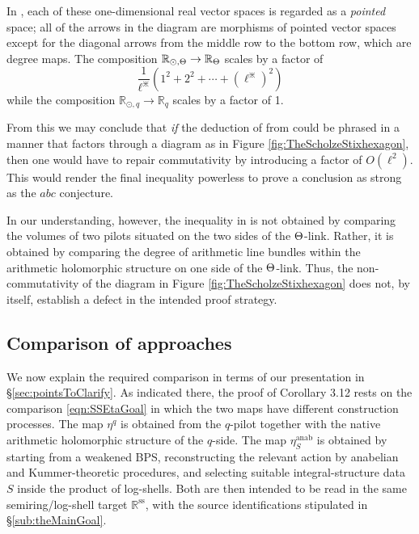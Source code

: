 \documentclass[12pt, reqno, a4paper]{amsart}
\def\bR{\mathbb{R}} %
\begin{document}
In \cite{Scholze2018WhyA}, each of these one-dimensional real vector spaces is regarded as a \textit{pointed} space; all of the arrows in the diagram are morphisms of pointed vector spaces except for the diagonal arrows from the middle row to the bottom row, which are degree maps.
The composition $\bR_{\odot,\Th} \to \bR_{\Th}$ scales by a factor of
\[
\frac{1}{\ell^{\divideontimes}} (1^2 + 2^2 + \cdots + (\ell^{\divideontimes})^2)
\]
while the composition $\bR_{\odot,q} \to \bR_q$ scales by a factor of 1.

From this we may conclude that \textit{if} the deduction of \cite[Cor.\ 3.12, pp.\ 597--598]{MR4225475} 
from \cite[Thm.\ 3.11, pp.\ 573--580]{MR4225475} could be phrased in a manner that factors through a diagram as in
Figure \ref{fig:TheScholzeStixhexagon}, then one would have to repair commutativity by introducing a factor of $O(\ell^2)$. This would render the final inequality powerless to prove a conclusion as strong as the $abc$ conjecture. 

In our understanding, however, the inequality in \cite[Cor.\ 3.12, pp.\ 597--598]{MR4225475} is not obtained by comparing the volumes of two pilots situated on the two sides of the $\Th$-link. Rather, it is obtained by comparing the degree of arithmetic line bundles within the arithmetic holomorphic structure on one side of the $\Th$-link. Thus, the non-commutativity of the diagram in Figure \ref{fig:TheScholzeStixhexagon} does not, by itself, establish a defect in the intended proof strategy.

\subsection{Comparison of approaches}\label{sub:SSActualComparison}

We now explain the required comparison in terms of our presentation in \S\ref{sec:pointsToClarify}.
As indicated there, the proof of Corollary 3.12 rests on the comparison \eqref{eqn:SSEtaGoal}
in which the two maps have different construction processes.  The map $\eta^q$ is obtained from the $q$-pilot together with the native arithmetic holomorphic structure of the $q$-side.  The map $\eta^{\mathrm{anab}}_S$ is obtained by starting from a weakened BPS, reconstructing the relevant action by anabelian and Kummer-theoretic procedures, and selecting suitable integral-structure data $S$ inside the product of log-shells.  Both are then intended to be read in the same semiring/log-shell target $\bR^{\mathrm{ss}}$, with the source identifications stipulated in \S\ref{sub:theMainGoal}. 
\end{document}
